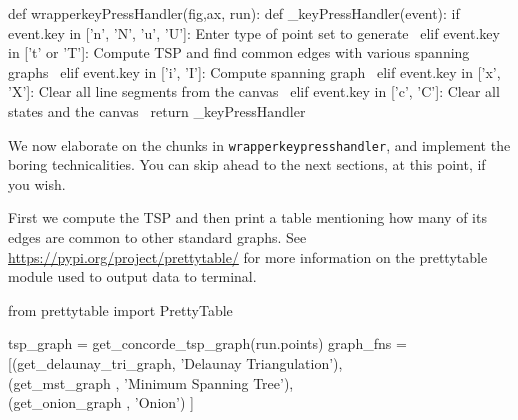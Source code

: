 \nwenddocs{}\plusendmoddef\nwstartdeflinemarkup{}\nwenddeflinemarkup
def wrapperkeyPressHandler(fig,ax, run): 
       def _keyPressHandler(event):
               if event.key in ['n', 'N', 'u', 'U']: 
                     \LA{}Enter type of point set to generate~{\nwtagstyle{}}\RA{}                   
               elif event.key in ['t' or 'T']:
                     \LA{}Compute TSP and find common edges with various spanning graphs~{\nwtagstyle{}}\RA{}
               elif event.key in ['i', 'I']:                     
                     \LA{}Compute spanning graph~{\nwtagstyle{}}\RA{}    
               elif event.key in ['x', 'X']:
                     \LA{}Clear all line segments from the canvas~{\nwtagstyle{}}\RA{}
               elif event.key in ['c', 'C']: 
                     \LA{}Clear all states and the canvas~{\nwtagstyle{}}\RA{}
       return _keyPressHandler
\nwendcode{}\nwdocspar

We now elaborate on the chunks in \verb|wrapperkeypresshandler|, and implement the boring technicalities. You 
can skip ahead to the next sections, at this point, if you wish. 

First we compute the TSP and then print a table mentioning how many of its edges are common to other
standard graphs. See \url{https://pypi.org/project/prettytable/} for more information on the 
prettytable module used to output data to terminal. 


\nwenddocs{}\plusendmoddef\nwstartdeflinemarkup{}\nwenddeflinemarkup
from prettytable import PrettyTable
\nwendcode{}\nwdocspar


\nwenddocs{}\endmoddef\nwstartdeflinemarkup{}\nwenddeflinemarkup
tsp_graph = get_concorde_tsp_graph(run.points)
graph_fns = [(get_delaunay_tri_graph, 'Delaunay Triangulation'), \\
             (get_mst_graph         , 'Minimum Spanning Tree'), \\
             (get_onion_graph       , 'Onion') ]


